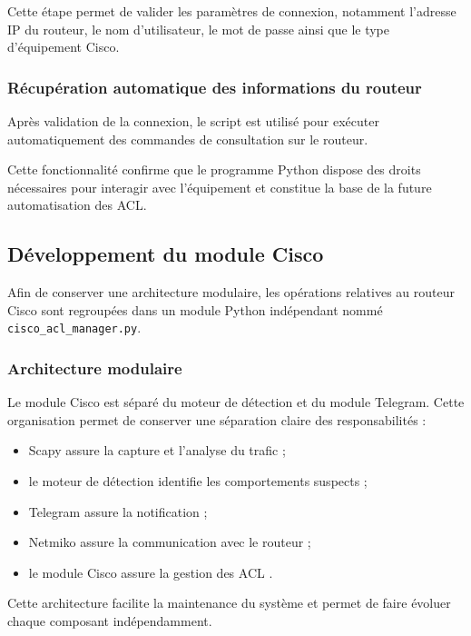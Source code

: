 Cette étape permet de valider les paramètres de connexion, notamment l'adresse IP du routeur, le nom d'utilisateur, le mot de passe ainsi que le type d'équipement Cisco.

\subsubsection{Récupération automatique des informations du routeur}

Après validation de la connexion, le script est utilisé pour exécuter automatiquement des commandes de consultation sur le routeur.

Cette fonctionnalité confirme que le programme Python dispose des droits nécessaires pour interagir avec l'équipement et constitue la base de la future automatisation des ACL.

\subsection{Développement du module Cisco}

Afin de conserver une architecture modulaire, les opérations relatives au routeur Cisco sont regroupées dans un module Python indépendant nommé \texttt{cisco\_acl\_manager.py}.

\subsubsection{Architecture modulaire}

Le module Cisco est séparé du moteur de détection et du module Telegram. Cette organisation permet de conserver une séparation claire des responsabilités :

\begin{itemize}
    \item Scapy assure la capture et l'analyse du trafic \cite{scapy_docs} ;
    \item le moteur de détection identifie les comportements suspects ;
    \item Telegram assure la notification ;
    \item Netmiko assure la communication avec le routeur \cite{netmiko_docs} ;
    \item le module Cisco assure la gestion des ACL \cite{cisco_ios}.
\end{itemize}

Cette architecture facilite la maintenance du système et permet de faire évoluer chaque composant indépendamment.

